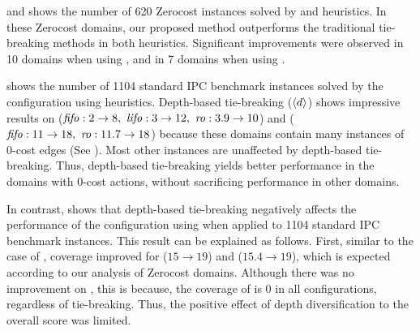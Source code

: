  and  shows the number of {620 Zerocost
instances} solved by \lmcut and \mands heuristics. In these
Zerocost domains, our proposed method outperforms the traditional tie-breaking methods in both heuristics.
Significant improvements were observed in 10 domains when using \lmcut, and in 7 domains when using \mands.


 shows the number of {1104 standard IPC benchmark instances} solved by the configuration using \lmcut
heuristics. Depth-based tie-breaking (${\left<d\right>}$) shows impressive results on  ($\fifo:2\to 8,\ \lifo:3\to 12,\  \ro:3.9\to 10$) and  (${\text{\textit{fifo}}}: 11\to 18,\ {\text{\textit{ro}}}: 11.7\to 18$) because these
domains contain many instances of 0-cost edges (See
).  Most other instances are unaffected by depth-based tie-breaking.  Thus, depth-based
tie-breaking yields better performance in the domains with 0-cost actions, without sacrificing performance in
other domains.

In contrast,  shows that depth-based tie-breaking negatively affects the performance of
the configuration using \mands when applied to {1104 standard IPC benchmark instances}. This result can be explained as follows.
First,  similar to the case of \lmcut,  coverage improved for \fifo ($15\to 19$) and \ro ($15.4\to 19$), which is expected according to our analysis of Zerocost domains.
%
Although there was no improvement on , this is because, 
the coverage of  is 0 in all \mands configurations, regardless of tie-breaking. Thus, the positive
effect of depth diversification to the overall score was limited.


